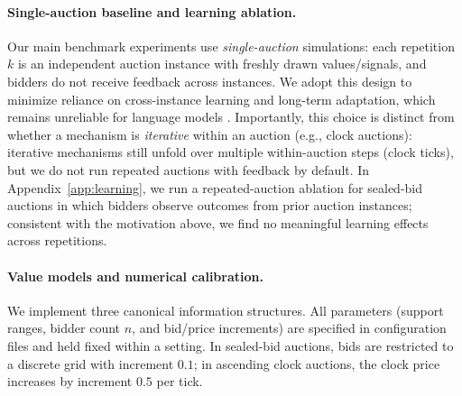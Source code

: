 \paragraph{Single-auction baseline and learning ablation.}
Our main benchmark experiments use \emph{single-auction} simulations: each repetition $k$ is an independent auction instance with freshly drawn values/signals, and bidders do not receive feedback across instances. We adopt this design to minimize reliance on cross-instance learning and long-term adaptation, which remains unreliable for language models \citet{dong2024survey}. Importantly, this choice is distinct from whether a mechanism is \emph{iterative} within an auction (e.g., clock auctions): iterative mechanisms still unfold over multiple within-auction steps (clock ticks), but we do not run repeated auctions with feedback by default. In Appendix~\ref{app:learning}, we run a repeated-auction ablation for sealed-bid auctions in which bidders observe outcomes from prior auction instances; consistent with the motivation above, we find no meaningful learning effects across repetitions.

\paragraph{Value models and numerical calibration.}
We implement three canonical information structures. All parameters (support ranges, bidder count $n$, and bid/price increments) are specified in configuration files and held fixed within a setting. In sealed-bid auctions, bids are restricted to a discrete grid with increment $0.1$; in ascending clock auctions, the clock price increases by increment $0.5$ per tick.

